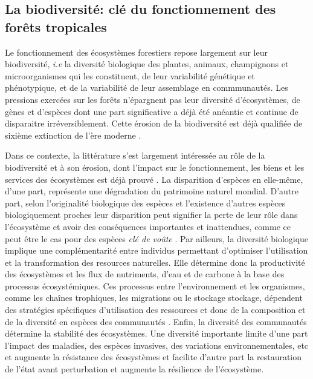 \documentclass[
  11pt,
  french,
  A4paper,
  extrafontsizes,onecolumn,openright
  ]{memoir}
\begin{document}
\subsection{La biodiversité: clé du fonctionnement des forêts
tropicales}\label{la-biodiversite-cle-du-fonctionnement-des-forets-tropicales}

Le fonctionnement des écosystèmes forestiers repose largement sur leur
biodiversité, \emph{i.e} la diversité biologique des plantes, animaux,
champignons et microorganismes qui les constituent, de leur variabilité
génétique et phénotypique, et de la variabilité de leur assemblage en
commmunautés. Les pressions exercées sur les forêts n'épargnent pas leur
diversité d'écosystèmes, de gènes et d'espèces dont une part
significative a déjà été anéantie et continue de disparaitre
irréversiblement. Cette érosion de la biodiversité est déjà qualifiée de
sixième extinction de l'ère moderne
\autocites{Vitousek1997}{Cardinale2012}.

Dans ce contexte, la littérature s'est largement intéressée au rôle de
la biodiversité et à son érosion, dont l'impact sur le fonctionnement,
les biens et les services des écosystèmes est déjà prouvé
\autocites{Sterner2002}{Cardinale2012}{Tilman2014}. La disparition
d'espèces en elle-même, d'une part, représente une dégradation du
patrimoine naturel mondial. D'autre part, selon l'originalité biologique
des espèces et l'existence d'autres espèces biologiquement proches leur
disparition peut signifier la perte de leur rôle dans l'écosystème et
avoir des conséquences importantes et inattendues, comme ce peut être le
cas pour des espèces \emph{clé de voûte}
\autocites{Jones1994}{Power1996}{Gardner2007}. Par ailleurs, la
diversité biologique implique une complémentarité entre individus
permettant d'optimiser l'utilisation et la transformation des resources
naturelles. Elle détermine donc la productivité des écosystèmes et les
flux de nutriments, d'eau et de carbone à la base des processus
écosystémiques. Ces processus entre l'environnement et les organismes,
comme les chaînes trophiques, les migrations ou le stockage stockage,
dépendent des stratégies spécifiques d'utilisation des ressources et
donc de la composition et de la diversité en espèces des communautés
\autocite{Begon2006}. Enfin, la diversité des communautés détermine la
stabilité des écosystèmes. Une diversité importante limite d'une part
l'impact des maladies, des espèces invasives, des variations
environnementales, etc et augmente la résistance des écosystèmes et
facilite d'autre part la restauration de l'état avant perturbation et
augmente la résilience de l'écosystème\autocite{Elmqvist2003}.
\end{document}
